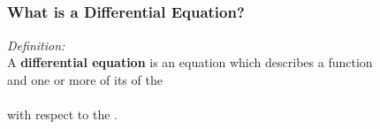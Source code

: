 \documentclass[fleqn]{beamer} %
\newcommand{\sectionIsubsectionItitle}{}
\newcommand{\sectionIsubsectionIItitle}{}
\begin{document}
		\subsection{\sectionIsubsectionItitle}\label{sectionIsubsectionI}

			\begin{frame}
				\frametitle{\sectionIsubsectionItitle}
				\bigskip

				\frametitle{What is a Differential Equation?}
				  {\it Definition:\vspace{3mm}\\}
				  A {\bf differential equation} is an equation which describes a function \vspace{3mm}\\and one or more of its \underline{\hspace{50mm}} of the \vspace{3mm}\\ \underline{\hspace{50mm}}\hspace{3mm}\underline{\hspace{50mm}}\vspace{5mm} \\ with respect to the \underline{\hspace{60mm}}.

				
				\btVFill
			\end{frame}


				


		\subsection{\sectionIsubsectionIItitle}\label{sectionIsubsectionII}
\end{document}
